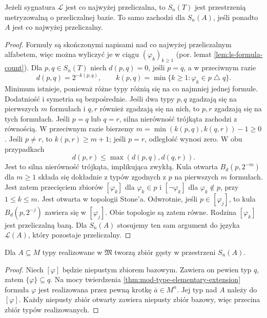 \begin{wniosek}
\label{cor:mod-stone-metrizable}
Jeżeli sygnatura $\mathcal L$ jest co najwyżej przeliczalna,
to $S_n(T)$ jest przestrzenią metryzowalną o przeliczalnej
bazie. To samo zachodzi dla $S_n(A)$, jeśli ponadto $A$
jest co najwyżej przeliczalny.
\end{wniosek}
\begin{proof}
Formuły są skończonymi napisami nad co najwyżej przeliczalnym
alfabetem, więc można wyliczyć je w ciągu
$(\varphi_k)_{k\geq 1}$ (por. lemat \ref{lem:ls-formula-count}).
Dla $p,q\in S_n(T)$ niech $d(p,q)=0$, jeśli $p=q$,
a w przeciwnym razie
\[
d(p,q)=2^{-k(p,q)},\qquad
k(p,q)=\min\{k\geq 1:\varphi_k\in p\mathbin{\triangle}q\}.
\]
Minimum istnieje, ponieważ różne typy różnią się na co
najmniej jednej formule. Dodatniość i symetria są bezpośrednie.
Jeśli dwa typy $p,q$ zgadzają się na pierwszych $m$ formułach
i $q,r$ również zgadzają się na nich, to $p,r$ zgadzają się
na tych formułach. Jeśli $p=q$ lub $q=r$, silna nierówność trójkąta zachodzi
z równością. W przeciwnym razie bierzemy
$m=\min(k(p,q),k(q,r))-1\geq0$. Jeśli $p\ne r$, to
$k(p,r)\geq m+1$; jeśli $p=r$, odległość wynosi zero.
W obu przypadkach
\[
d(p,r)\leq\max(d(p,q),d(q,r)).
\]
Jest to silna nierówność trójkąta, implikująca zwykłą.
Kula otwarta $B_d(p,2^{-m})$ dla $m\geq 1$ składa się
dokładnie z typów zgodnych z $p$ na pierwszych $m$ formułach.
Jest zatem przecięciem zbiorów $[\varphi_k]$ dla
$\varphi_k\in p$ i $[\neg\varphi_k]$ dla $\varphi_k\notin p$,
przy $1\leq k\leq m$. Jest otwarta w topologii Stone'a.
Odwrotnie, jeśli $p\in[\varphi_j]$, to kula
$B_d(p,2^{-j})$ zawiera się w $[\varphi_j]$.
Obie topologie są zatem równe. Rodzina $[\varphi_k]$ jest
przeliczalną bazą. Dla $S_n(A)$ stosujemy ten sam argument
do języka $\mathcal L(A)$, który pozostaje przeliczalny.
\end{proof}

\begin{wniosek}
\label{cor:mod-realized-types-dense}
Dla $A\subseteq M$ typy realizowane w $\mathfrak M$
tworzą zbiór gęsty w przestrzeni $S_n(A)$.
\end{wniosek}
\begin{proof}
Niech $[\varphi]$ będzie niepustym zbiorem bazowym.
Zawiera on pewien typ $q$, zatem $\{\varphi\}\subseteq q$.
Na mocy twierdzenia \ref{thm:mod-type-elementary-extension}
formuła $\varphi$ jest realizowana przez pewną krotkę
$\bar a\in M^n$. Jej typ nad $A$ należy do $[\varphi]$.
Każdy niepusty zbiór otwarty zawiera niepusty zbiór bazowy,
więc przecina zbiór typów realizowanych.
\end{proof}

